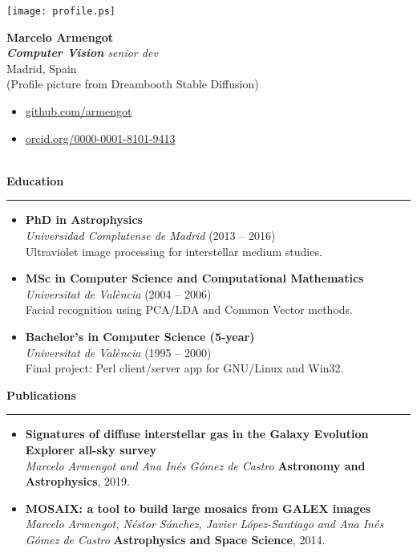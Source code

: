 \documentclass[10pt,a4paper]{article}
\newcommand{\sect}[1]{\vspace{6pt}\noindent\textbf{\large #1}\vspace{2pt}\hrule\vspace{6pt}}
\newcommand{\subsect}[1]{\vspace{4pt}\textbf{#1}}
\begin{document}
\pagestyle{empty}

\begin{center}
\begin{minipage}[c]{0.25\textwidth}
    \texttt{[image: profile.ps]}
\end{minipage}
\hfill
\begin{minipage}[c]{0.7\textwidth}
    {\LARGE \textbf{Marcelo Armengot}} \\[4pt]
    \textit{\textbf{Computer Vision} senior dev} \\[4pt]
    Madrid, Spain \\[4pt]
    (Profile picture from Dreambooth Stable Diffusion) \\
    \begin{itemize}[leftmargin=*,label={\textrightarrow}]
      \item \href{https://github.com/armengot}{github.com/armengot}
      \item \href{https://orcid.org/0000-0001-8101-9413}{orcid.org/0000-0001-8101-9413}
    \end{itemize}
\end{minipage}
\end{center}

~\\

\sect{Education}
\begin{itemize}[leftmargin=*]
  \item \subsect{PhD in Astrophysics}\\
    \textit{Universidad Complutense de Madrid} (2013 -- 2016) \\
    Ultraviolet image processing for interstellar medium studies.

  \item \subsect{MSc in Computer Science and Computational Mathematics}\\
    \textit{Universitat de València} (2004 -- 2006) \\
    Facial recognition using PCA/LDA and Common Vector methods.

  \item \subsect{Bachelor's in Computer Science (5-year)}\\
    \textit{Universitat de València} (1995 -- 2000) \\
    Final project: Perl client/server app for GNU/Linux and Win32.
\end{itemize}

\sect{Publications}
\begin{itemize}[leftmargin=*]
    \item \textbf{Signatures of diffuse interstellar gas in the Galaxy Evolution Explorer all-sky survey} \\
    \textit{Marcelo Armengot and Ana Inés Gómez de Castro} \textbf{Astronomy and Astrophysics}, 2019.
    
    \item \textbf{MOSAIX: a tool to build large mosaics from GALEX images} \\
    \textit{Marcelo Armengot, Néstor Sánchez, Javier López-Santiago and Ana Inés Gómez de Castro} \textbf{Astrophysics and Space Science}, 2014.
\end{itemize}
\end{document}
